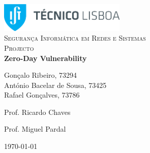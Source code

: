 \begin{titlepage}

\begin{center}

\includegraphics[width=6cm]{./title}\\[3cm]

\textsc{\LARGE Segurança Informática em Redes e Sistemas}\\[1.5cm]

\textsc{\Large Projecto}\\[1.5cm]


{ \huge \bfseries Zero-Day Vulnerability \\[2.5cm] }


\noindent
\begin{center} \large
Gonçalo Ribeiro, 73294\\[5mm]

António Bacelar de Sousa, 73425\\[5mm]

Rafael Gonçalves, 73786\\[2.5cm]

\end{center}

\begin{minipage}{0.4\textwidth}
\begin{flushleft} \Large
Prof. Ricardo Chaves
\end{flushleft}
\end{minipage}
\begin{minipage}{0.4\textwidth}
\begin{flushright} \Large
Prof. Miguel Pardal
\end{flushright}
\end{minipage}

\vfill

{\large \today}

\end{center}

\end{titlepage}